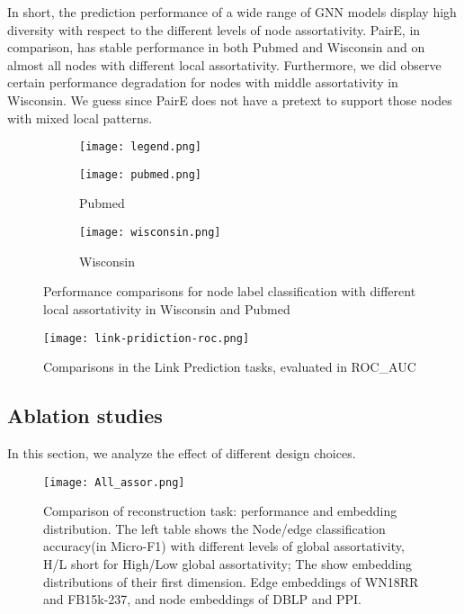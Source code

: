 \documentclass[10pt,journal,compsoc]{IEEEtran}
\begin{document}
In short, the prediction performance of a wide range of GNN models display high diversity with respect to the different levels of node assortativity. PairE, in comparison, has stable performance in both Pubmed and Wisconsin and on almost all nodes with different local assortativity. Furthermore, we did observe certain performance degradation for nodes with middle assortativity in Wisconsin. We guess since PairE does not have a pretext to support those nodes with mixed local patterns. 


\begin{figure}[htb]
\centering

\begin{subfigure}{0.8\columnwidth}
\centering
\texttt{[image: legend.png]}
\end{subfigure}


\begin{subfigure}{0.495\columnwidth}
\centering
\texttt{[image: pubmed.png]}
\caption{Pubmed}
\end{subfigure}
\begin{subfigure}{0.495\columnwidth}
\centering
\texttt{[image: wisconsin.png]}

 \caption{Wisconsin}
\end{subfigure}
\caption{Performance comparisons for node label classification with different local assortativity in Wisconsin and Pubmed}
\label{fig:local_assor}
\end{figure}


\begin{figure}[tb]
\centering
\texttt{[image: link-pridiction-roc.png]}
\vspace{-0.3cm} 
\centering
\caption{Comparisons in the Link Prediction tasks, evaluated in ROC\_AUC }
\vspace{-0.3cm}
\label{fig:link}
\end{figure}


\subsection{Ablation studies}
  In this section, we analyze the effect of different design choices.
    
\begin{figure*}[ht]
\centering

\texttt{[image: All\_assor.png]}
\caption{Comparison of reconstruction task: performance and embedding distribution. The left table shows the Node/edge classification accuracy(in Micro-F1) with different levels of global assortativity, H/L short for High/Low global assortativity; The  show embedding distributions of their first dimension. Edge embeddings of WN18RR and FB15k-237, and node embeddings of DBLP and PPI.}
\label{fig:assor}
\end{figure*}
\end{document}

